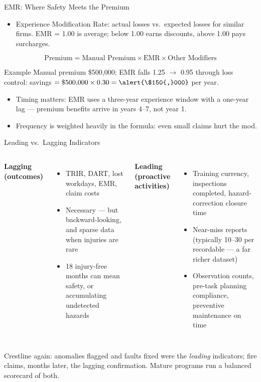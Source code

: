 \documentclass[11pt, aspectratio=169]{beamer}
\begin{document}
\begin{frame}{EMR: Where Safety Meets the Premium}
\begin{itemize}
  \item \alert{Experience Modification Rate}: actual losses vs.\ expected losses for similar firms. EMR = 1.00 is average; below 1.00 earns discounts, above 1.00 pays surcharges.
\end{itemize}
\[
\text{Premium} = \text{Manual Premium} \times \text{EMR} \times \text{Other Modifiers}
\]
\begin{exampleblock}{Example}
Manual premium \$500{,}000; EMR falls 1.25 $\rightarrow$ 0.95 through loss control: savings $= \$500{,}000 \times 0.30 = \alert{\$150{,}000}$ per year.
\end{exampleblock}
\medskip
\begin{itemize}
  \item Timing matters: EMR uses a three-year experience window with a one-year lag --- premium benefits arrive in years 4--7, not year 1.
  \item Frequency is weighted heavily in the formula: even small claims hurt the mod.
\end{itemize}
\end{frame}

\begin{frame}{Leading vs.\ Lagging Indicators}
\begin{columns}[T]
\textbf{Lagging (outcomes)}
\begin{itemize}
  \item TRIR, DART, lost workdays, EMR, claim costs
  \item Necessary --- but backward-looking, and sparse data when injuries are rare
  \item 18 injury-free months can mean safety, or accumulating undetected hazards
\end{itemize}
\textbf{Leading (proactive activities)}
\begin{itemize}
  \item Training currency, inspections completed, hazard-correction closure time
  \item Near-miss reports (typically 10--30 per recordable --- a far richer dataset)
  \item Observation counts, pre-task planning compliance, preventive maintenance on time
\end{itemize}
\end{columns}
\medskip
Crestline again: anomalies flagged and faults fixed were the \emph{leading} indicators; fire claims, months later, the lagging confirmation. Mature programs run a balanced scorecard of both.
\end{frame}
\end{document}
